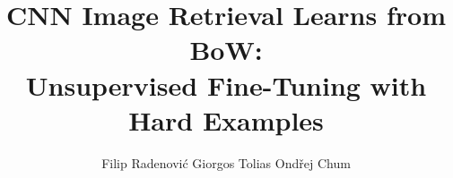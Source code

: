 \documentclass[runningheads]{llncs}
\begin{document}
\pagestyle{headings}
\mainmatter
\def\ECCV16SubNumber{825}  


\title{CNN Image Retrieval Learns from BoW:\\ Unsupervised Fine-Tuning with Hard Examples}



\newcommand{\namespace}{\hspace{5mm}} \author{Filip Radenovi{\'c} \namespace Giorgos Tolias \namespace Ond{\v r}ej Chum} 


\maketitle

\def\ie{\emph{i.e.}\xspace}
\def\eg{\emph{e.g.}\xspace}
\def\wrt{\emph{w.r.t.}\xspace}
\def\etal{\emph{et al.}\xspace}


\newcommand{\real}{\mathbb{R}}
\newcommand{\realnn}{{\mathbb{R}^{+}_{0}}}
\newcommand{\nat}{\mathbb{N}}
\newcommand{\natzero}{{\mathbb{N}_{0}}}

\newcommand{\loss}{\mathcal{L}}

\newcommand{\cX}{\mathcal{X}}
\newcommand{\cI}{\mathcal{I}}
\newcommand{\cP}{\mathcal{P}}
\newcommand{\cE}{\mathcal{E}}
\newcommand{\cN}{\mathcal{N}}
\newcommand{\cM}{\mathcal{M}}

\newcommand{\bG}{\mathbb{G}}
\newcommand{\cG}{\boldsymbol{\mathcal{G}}}


\newcommand{\vf}{\mathbf{f}}
\newcommand{\f}{\mathrm{f}}
\newcommand{\mac}{\bar{\vf}}

\def\l2{}

\xspaceaddexceptions{+}
\def\cpl2{L\textsubscript{w}\xspace}
\def\pcawhiten{PCA\textsubscript{w}\xspace}

\def\cropI{\xspace}
\def\cropA{\xspace}

\renewcommand{\paragraph}[1]{{\medskip \noindent \bf #1}}
\newcommand{\pari}[1]{{\medskip \noindent \it #1}}
\newcommand{\equ}[1]{Equation~(\ref{#1})\xspace}
\end{document}
